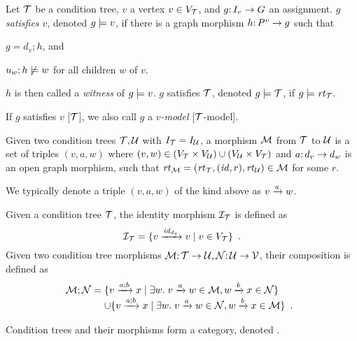 \begin{definition}[satisfaction]\label{def:satisfaction}
Let ${\mathcal{T}}$ be a condition tree, $v$ a vertex $v\in V_{\mathcal{T}}$,  and $g{:}\, I_v\rightarrow G$ an assignment. $g$ \emph{satisfies $v$}, denoted $g\models v$, if there is a graph morphism $h{:}\, P^v\rightarrow g$ such that
\begin{inumerate}
\item $g=d_v;h$, and 
\item $u_w;h\not\models w$ for all children $w$ of $v$.
\end{inumerate}
$h$ is then called a \emph{witness} of $g\models v$.
$g$ satisfies ${\mathcal{T}}$, denoted $g\models{\mathcal{T}}$, if $g\models\mathit{rt}_{{\mathcal{T}}}$.
\end{definition}
%
If $g$ satisfies $v$ [${\mathcal{T}}$], we also call $g$ a \emph{$v$-model} [${\mathcal{T}}$-model].

\begin{definition}[morphism]
Given two condition trees ${\mathcal{T}},{\mathcal{U}}$ with $I_{\mathcal{T}}=I_{\mathcal{U}}$, a morphism ${\mathcal{M}}$ from ${\mathcal{T}}$ to ${\mathcal{U}}$ is a set of triples $(v,a,w)$ where $(v,w)\in (V_{\mathcal{T}}\times V_{\mathcal{U}})\cup (V_{\mathcal{U}}\times V_{\mathcal{T}})$ and $a{:}\, d_v\rightarrow d_w$ is an open graph morphism, such that $\mathit{rt}_{{\mathcal{M}}}=(\mathit{rt}_{{\mathcal{T}}},({\mathit{id}},r),\mathit{rt}_{{\mathcal{U}}})\in {\mathcal{M}}$ for some $r$.
\end{definition}
%
We typically denote a triple $(v,a,w)$ of the kind above as $v\xrightarrow{a} w$.

Given a condition tree ${\mathcal{T}}$, the identity morphism ${\mathcal{I}}_{\mathcal{T}}$ is defined as
\[ {\mathcal{I}}_{\mathcal{T}} = \{{{v}\xrightarrow{{\mathit{id}}_{d_v}}{v} \mid v\in V_{\mathcal{T}}}\} \enspace. \]
Given two condition tree morphisms ${\mathcal{M}}{:}\, {\mathcal{T}}\rightarrow {\mathcal{U}},{\mathcal{N}}{:}\, {\mathcal{U}}\rightarrow {\mathcal{V}}$, their composition is defined as
\[ \cM;\cN =
\begin{array}[t]{@{}l}
	\setof{\trip v{a;b}x \mid \exists w\st \trip v a w\in\cM, \trip wbx\in \cN} \\
	\cup \setof{\trip v{a;b}x \mid \exists w\st \trip vaw\in\cN, \trip wbx\in\cM} \enspace.
\end{array}
\]

\begin{proposition}
Condition trees and their morphisms form a category, denoted {\CT}.
\end{proposition}


